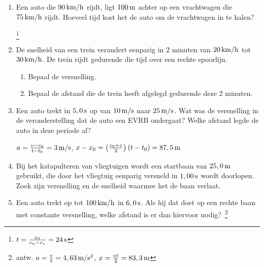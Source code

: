\begin{enumerate}
\item Een auto die $90\rm\,km/h$ rijdt, ligt $100\rm\,m$ achter op een vrachtwagen die $75\rm\,km/h$ rijdt. Hoeveel tijd kost het de auto om de vrachtwagen in te halen? 
\begin{oplossing}
\footnote{$t=\frac{x_0}{v_a-v_v}=24\rm\,s$}
\end{oplossing}

\item De snelheid van een trein verandert eenparig in 2 minuten van $20\rm\,km/h$ tot $30\rm\,km/h$. De trein rijdt gedurende die tijd over een rechte spoorlijn.
\begin{enumerate}
    \item Bepaal de versnelling.
    \item Bepaal de afstand die de trein heeft afgelegd gedurende deze 2 minuten.
\end{enumerate}

\item Een auto trekt in $5,0\rm\,s$ op van $10\rm\,m/s$ naar $25\rm\,m/s$. Wat was de versnelling in de veronderstelling dat de auto een EVRB ondergaat? Welke afstand legde de auto in deze periode af?
\begin{oplossing}
\newline
$a=\frac{v-v_0}{t-t_0}=3\rm\,m/s$,
$x-x_0=\left(\frac{v_0+v}{2}\right)(t-t_0)=87,5\rm\,m$
\end{oplossing}

\item Bij het katapulteren van vliegtuigen wordt een startbaan van
$25,0\rm\,m$ gebruikt, die door het vliegtuig eenparig versneld in
$1,00\rm\,s$ wordt doorlopen. Zoek zijn versnelling en de snelheid
waarmee het de baan verlaat.

\item Een auto trekt op tot $100\rm\,km/h$ in $6,0\rm\,s$. Als hij
dat doet op een rechte baan met constante versnelling, welke afstand
is er dan hiervoor nodig?~\footnote{antw.
$a=\frac{v}{t}=4,63\rm\,m/s^2$, $x=\frac{vt}{2}=83,3\rm\,m$}


\end{enumerate}
